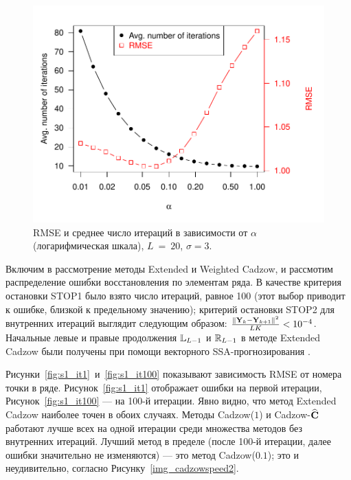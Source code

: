 \documentclass[12pt, specialist, subf,href,colorlinks=true,substylefile = spbu.rtx]{disser}
\theoremstyle{remark}
\theoremstyle{definition}
\begin{document}
\begin{figure}[!hhh]
	\includegraphics[width = \columnwidth]{2axis-3.pdf}
	\caption{RMSE и среднее число итераций в зависимости от $\alpha$ (логарифмическая шкала), $L~=~20$, $\sigma=3$.}
	\label{img_2axis-3}
\end{figure}


\smallskip
Включим в рассмотрение методы Extended и Weighted Cadzow, и рассмотим распределение ошибки восстановления по элементам ряда. В качестве критерия остановки STOP1 было взято число итераций, равное 100 (этот выбор приводит к ошибке, близкой к предельному значению); критерий остановки STOP2 для внутренних итераций выглядит следующим образом:
$\frac{\|\mathbf{Y}_k - \mathbf{Y}_{k+1}\|^2}{LK} < 10^{-4}$. Начальные левые и правые продолжения $\mathbb{L}_{L-1}$ и $\mathbb{R}_{L-1}$ в методе Extended Cadzow были получены при помощи векторного SSA-прогнозирования \cite[глава 2.3.1]{Golyandina.etal2001}.

Рисунки~\ref{fig:s1_it1}~и~\ref{fig:s1_it100} показывают зависимость RMSE от номера точки в ряде. Рисунок~\ref{fig:s1_it1} отображает ошибки на первой итерации, Рисунок~\ref{fig:s1_it100} --- на 100-й итерации. Явно видно, что метод Extended Cadzow наиболее точен в обоих случаях. Методы Cadzow($1$) и Cadzow-$\widehat{\mathbf{C}}$ работают лучше всех на одной итерации среди множества методов без внутренних итераций. Лучший метод в пределе (после 100-й итерации, далее ошибки значительно не изменяются) --- это метод Cadzow($0.1$); это и неудивительно, согласно Рисунку~\ref{img_cadzowspeed2}.
\end{document}
